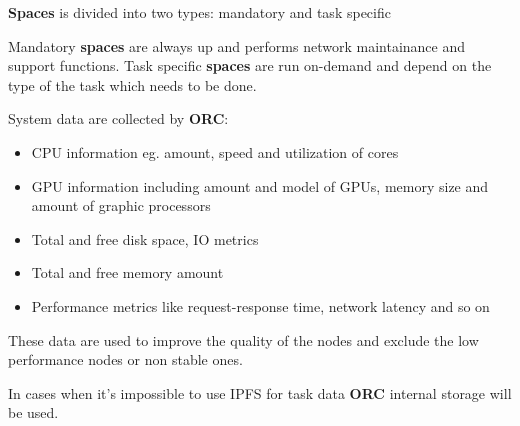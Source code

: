 \newpage

\textbf{Spaces} is divided into two types: mandatory and task specific

Mandatory \textbf{spaces} are always up and performs network maintainance and support functions.
Task specific \textbf{spaces} are run on-demand and depend on the type of the task which needs to be done.

System data are collected by \textbf{ORC}:

\begin{itemize}
    \item CPU information eg. amount, speed and utilization of cores
    \item GPU information including amount and model of GPUs, memory size and amount of graphic processors
    \item Total and free disk space, IO metrics
    \item Total and free memory amount
    \item Performance metrics like request-response time, network latency and so on
\end{itemize}

These data are used to improve the quality of the nodes and exclude the low performance nodes or non stable ones.

In cases when it's impossible to use IPFS for task data \textbf{ORC} internal storage will be used.
